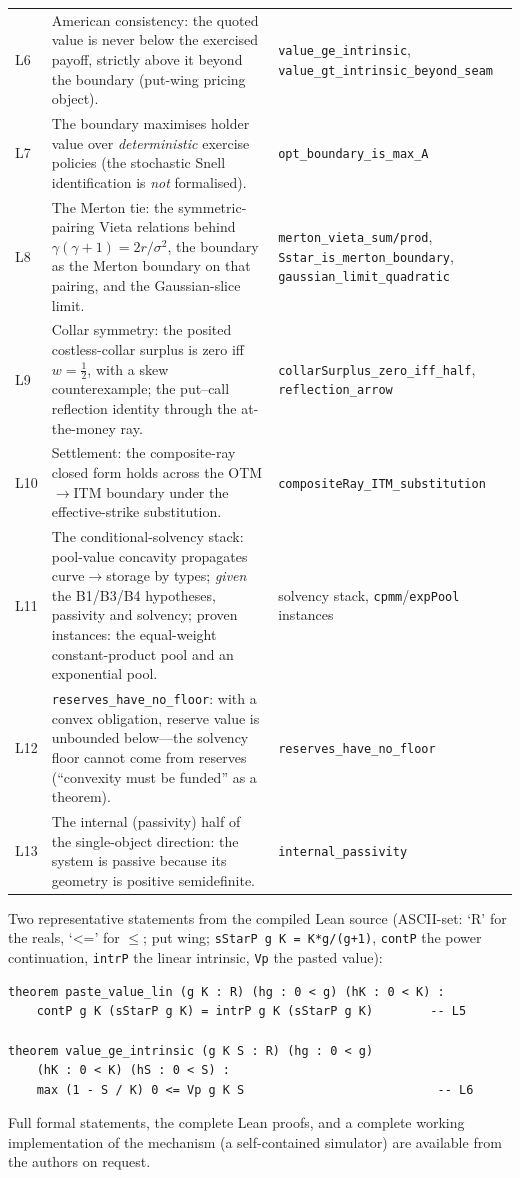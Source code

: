 \documentclass[runningheads]{llncs}
\begin{document}
\begin{center}
\begin{tabularx}{\textwidth}{@{}l X l@{}}
L6 & American consistency: the quoted value is never below the exercised
     payoff, strictly above it beyond the boundary (put-wing pricing object).
     & \texttt{value\_ge\_intrinsic},
       \texttt{value\_gt\_intrinsic\_beyond\_seam} \\
L7 & The boundary maximises holder value over \emph{deterministic} exercise
     policies (the stochastic Snell identification is \emph{not} formalised).
     & \texttt{opt\_boundary\_is\_max\_A} \\
L8 & The Merton tie: the symmetric-pairing Vieta relations behind
     $\gamma(\gamma+1)=2r/\sigma^{2}$, the boundary as the Merton boundary on
     that pairing, and the Gaussian-slice limit.
     & \texttt{merton\_vieta\_sum/prod},
       \texttt{Sstar\_is\_merton\_boundary}, \texttt{gaussian\_limit\_quadratic} \\
L9 & Collar symmetry: the posited costless-collar surplus is zero iff
     $w=\tfrac12$, with a skew counterexample; the put--call reflection
     identity through the at-the-money ray.
     & \texttt{collarSurplus\_zero\_iff\_half}, \texttt{reflection\_arrow} \\
L10 & Settlement: the composite-ray closed form holds across the OTM$\to$ITM
     boundary under the effective-strike substitution.
     & \texttt{compositeRay\_ITM\_substitution} \\
L11 & The conditional-solvency stack: pool-value concavity propagates
     curve$\to$storage by types; \emph{given} the B1/B3/B4 hypotheses,
     passivity and solvency; proven instances: the equal-weight
     constant-product pool and an exponential pool.
     & solvency stack, \texttt{cpmm}/\texttt{expPool} instances \\
L12 & \texttt{reserves\_have\_no\_floor}: with a convex obligation, reserve
     value is unbounded below---the solvency floor cannot come from reserves
     (``convexity must be funded'' as a theorem).
     & \texttt{reserves\_have\_no\_floor} \\
L13 & The internal (passivity) half of the single-object direction: the system
     is passive because its geometry is positive semidefinite.
     & \texttt{internal\_passivity} \\
\bottomrule
\end{tabularx}
\end{center}
Two representative statements from the compiled Lean source (ASCII-set: `R'
for the reals, `<=' for $\le$; put wing; \texttt{sStarP g K = K*g/(g+1)},
\texttt{contP} the power continuation, \texttt{intrP} the linear intrinsic,
\texttt{Vp} the pasted value):
\begin{verbatim}
theorem paste_value_lin (g K : R) (hg : 0 < g) (hK : 0 < K) :
    contP g K (sStarP g K) = intrP g K (sStarP g K)        -- L5

theorem value_ge_intrinsic (g K S : R) (hg : 0 < g)
    (hK : 0 < K) (hS : 0 < S) :
    max (1 - S / K) 0 <= Vp g K S                           -- L6
\end{verbatim}
Full formal statements, the complete Lean proofs, and a complete working
implementation of the mechanism (a self-contained simulator) are available
from the authors on request.
\end{document}
